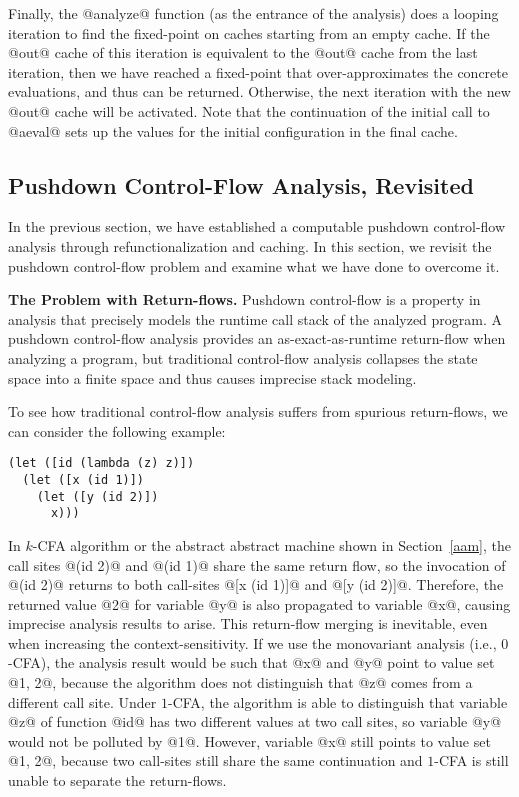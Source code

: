 \documentclass[acmsmall]{acmart}\settopmatter{}
\begin{document}
Finally, the @analyze@ function (as the entrance of the analysis) does a looping iteration
to find the fixed-point on caches starting from an empty cache.
If the @out@ cache of this iteration is equivalent to the @out@ cache from the last iteration,
then we have reached a fixed-point that over-approximates the concrete evaluations,
and thus can be returned.
Otherwise, the next iteration with the new @out@ cache will be activated.
Note that the continuation of the initial call to @aeval@ sets up the values for the
initial configuration in the final cache.

\subsection{Pushdown Control-Flow Analysis, Revisited} \label{pdcfarevisit}

In the previous section, we have established a computable pushdown control-flow
analysis through refunctionalization and caching. In this section,
we revisit the pushdown control-flow problem and examine what we have done to
overcome it.

\textbf{The Problem with Return-flows.}
Pushdown control-flow is a property in analysis that precisely models
the runtime call stack of the analyzed program.
A pushdown control-flow analysis provides an as-exact-as-runtime return-flow
when analyzing a program, but traditional control-flow analysis collapses
the state space into a finite space and thus causes imprecise stack modeling.

To see how traditional control-flow analysis suffers from spurious return-flows,
we can consider the following example:

\begin{lstlisting}
(let ([id (lambda (z) z)])
  (let ([x (id 1)])
    (let ([y (id 2)])
      x)))
\end{lstlisting}

In $k$-CFA algorithm or the abstract abstract machine shown in Section~\ref{aam},
the call sites @(id 2)@ and @(id 1)@ share the same return flow,
so the invocation of @(id 2)@ returns to both call-sites @[x (id 1)]@ and @[y (id 2)]@.
Therefore, the returned value @2@ for variable @y@ is also propagated to
variable @x@, causing imprecise analysis results to arise.
This return-flow merging is inevitable, even when increasing the context-sensitivity.
If we use the monovariant analysis (i.e., $0$-CFA), the analysis result would be such 
that @x@ and @y@ point to value set @{1, 2}@, because the algorithm does not distinguish 
that @z@ comes from a different call site.
Under $1$-CFA, the algorithm is able to distinguish that variable @z@ of function
@id@ has two different values at two call sites, so variable @y@
would not be polluted by @1@.
However, variable @x@ still points to value set @{1, 2}@, because two call-sites still 
share the same continuation and $1$-CFA is still unable to separate the return-flows.
\end{document}
